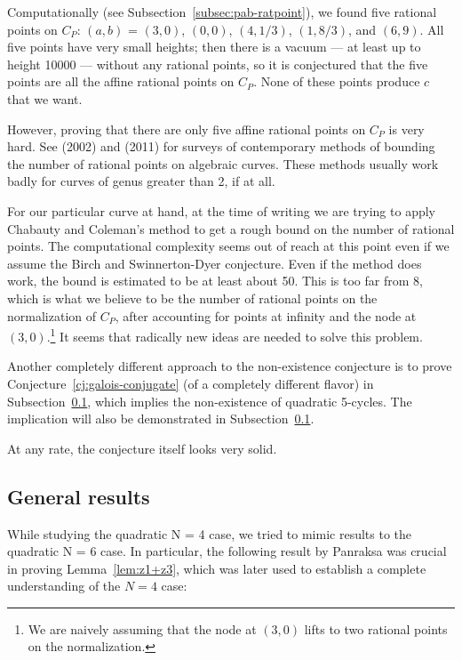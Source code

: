 Computationally (see Subsection~\ref{subsec:pab-ratpoint}), we found
five rational points on $C_P$: $(a, b)$ = $(3, 0)$, $(0, 0)$, $(4,
1/3)$, $(1, 8/3)$, and $(6, 9)$. All five points have very small
heights; then there is a vacuum --- at least up to height 10000 ---
without any rational points, so it is conjectured that the five points
are all the affine rational points on $C_P$. None of these points
produce $c$ that we want.

However, proving that there are only five affine rational points on
$C_P$ is very hard. See \cite{MR1956273} (2002) and \cite{MR2780629}
(2011) for surveys of contemporary methods of bounding the number of
rational points on algebraic curves. These methods usually work badly
for curves of genus greater than 2, if at all.

For our particular curve at hand, at the time of writing we are trying
to apply Chabauty and Coleman's method to get a rough bound on the
number of rational points. The computational complexity seems out of
reach at this point even if we assume the Birch and Swinnerton-Dyer
conjecture. Even if the method does work, the bound is estimated to be
at least about 50. This is too far from 8,
which is what we believe to be the number of rational points on the
normalization of $C_P$, after accounting for points at infinity and
the node at $(3, 0)$.\footnote{%
  We are naively assuming that the node at $(3, 0)$ lifts to two
  rational points on the normalization.}
It seems that radically new ideas are needed to solve this problem.

Another completely different approach to the non-existence conjecture
is to prove Conjecture~\ref{cj:galois-conjugate} (of a completely
different flavor) in Subsection~\ref{subsec:general}, which implies
the non-existence of quadratic 5-cycles. The implication will also be
demonstrated in Subsection~\ref{subsec:general}.

At any rate, the conjecture itself looks very solid.

\subsection{General results}
\label{subsec:general}

While studying the quadratic N = 4 case, we tried to mimic results
to the quadratic N = 6 case. In particular, the following result by
Panraksa was crucial in proving Lemma~\ref{lem:z1+z3}, which was later
used to establish a complete understanding of the $N = 4$ case:

